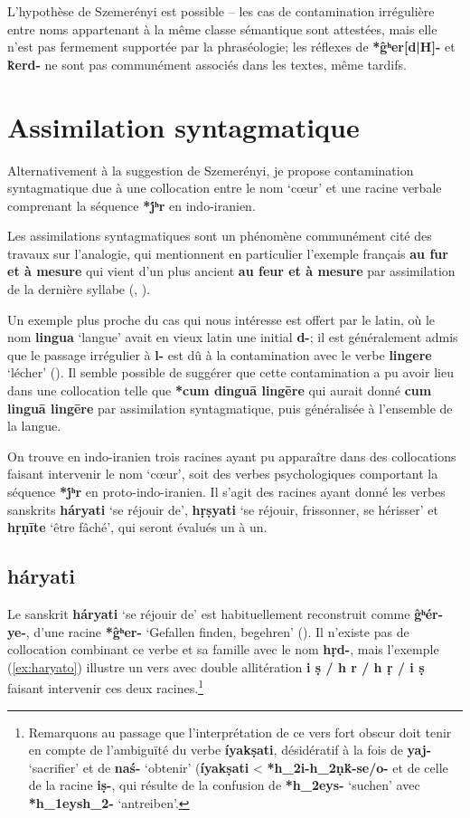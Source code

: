 \documentclass{article}
\newcommand{\ipa}[1]{{\phon\textbf{#1}}}
\begin{document}
L'hypothèse de Szemerényi est possible -- les cas de contamination irrégulière entre noms appartenant à la même classe sémantique sont attestées, mais elle n'est pas fermement supportée par la phraséologie; les réflexes de \ipa{*ĝʰer[d|H]-} et \ipa{k̂erd-} ne sont pas communément associés dans les textes, même tardifs.

\section{Assimilation syntagmatique}
Alternativement à la suggestion de Szemerényi, je propose  contamination syntagmatique due à une collocation entre le nom `cœur' et une racine verbale comprenant la séquence \ipa{*j́ʰr} en indo-iranien. 

Les assimilations syntagmatiques sont un phénomène communément cité des travaux sur l'analogie, qui mentionnent en particulier l'exemple français \ipa{au fur et à mesure} qui vient d'un plus ancient \ipa{au feur et à mesure} par assimilation de la dernière syllabe (\citealt[16]{andersen80morpho}, \citealt[64]{fertig13analogy}). %

Un exemple plus proche du cas qui nous intéresse est offert par le latin, où le nom \ipa{lingua} `langue' avait en vieux latin une initial \ipa{d-}; il est généralement admis que le passage irrégulier à \ipa{l-} est dû à la contamination avec le verbe \ipa{lingere} `lécher' (\citealt[304]{hock91principles}). Il semble possible de suggérer que cette contamination a pu avoir lieu dans une collocation telle que \ipa{*cum dinguā lingēre} qui aurait donné \ipa{cum linguā lingēre} par assimilation syntagmatique, puis généralisée à l'ensemble de la langue.
 
On trouve en indo-iranien trois racines ayant pu apparaître dans des collocations faisant intervenir le nom `cœur', soit des verbes psychologiques comportant la séquence \ipa{*j́ʰr} en proto-indo-iranien. Il s'agit des racines ayant donné les verbes sanskrits \ipa{háryati} `se réjouir de', \ipa{hṛṣyati} `se réjouir, frissonner, se hérisser' et \ipa{hṛṇīte} `être fâché', qui seront évalués un à un.

\subsection{\ipa{háryati}} \label{sec:haryati}

Le sanskrit \ipa{háryati} `se réjouir de' est habituellement reconstruit comme \ipa{ĝʰér-ye-}, d'une racine \ipa{*ĝʰer-} `Gefallen finden, begehren' (\citealt[176]{liv}). Il n'existe pas de collocation combinant ce verbe et sa famille avec le nom \ipa{hṛd-}, mais l'exemple (\ref{ex:haryato}) illustre un vers avec double allitération \ipa{i ṣ / h r / h ṛ / i ṣ} faisant intervenir ces deux racines.\footnote{Remarquons au passage que l'interprétation de ce vers fort obscur doit tenir en compte de l'ambiguïté du verbe \ipa{íyakṣati}, désidératif à la fois de \ipa{yaj-} `sacrifier' et de \ipa{naś-} `obtenir' (\ipa{íyakṣati} < \ipa{*h_2i-h_2ṇḱ-se/o-} et de celle de la racine \ipa{iṣ-}, qui résulte de la confusion de \ipa{*h_2eys-} `suchen' avec \ipa{*h_1eysh_2-} `antreiben'. }
\end{document}
